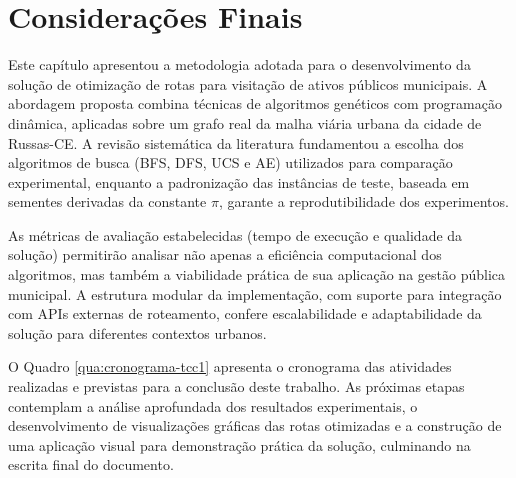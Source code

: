 \section{Considerações Finais}

Este capítulo apresentou a metodologia adotada para o desenvolvimento da solução de otimização de 
rotas para visitação de ativos públicos municipais. A abordagem proposta combina técnicas de 
algoritmos genéticos com programação dinâmica, aplicadas sobre um grafo real da malha viária urbana 
da cidade de Russas-CE. A revisão sistemática da literatura fundamentou a escolha dos algoritmos 
de busca (\gls{BFS}, \gls{DFS}, \gls{UCS} e \gls{AE}) utilizados para comparação experimental, 
enquanto a padronização das instâncias de teste, baseada em sementes derivadas da constante $\pi$, 
garante a reprodutibilidade dos experimentos.

As métricas de avaliação estabelecidas (tempo de execução e qualidade da solução) permitirão 
analisar não apenas a eficiência computacional dos algoritmos, mas também a viabilidade prática 
de sua aplicação na gestão pública municipal. A estrutura modular da implementação, com suporte 
para integração com \gls{API}s externas de roteamento, confere escalabilidade e adaptabilidade 
da solução para diferentes contextos urbanos.

O Quadro \ref{qua:cronograma-tcc1} apresenta o cronograma das atividades realizadas e previstas 
para a conclusão deste trabalho. As próximas etapas contemplam a análise aprofundada dos resultados 
experimentais, o desenvolvimento de visualizações gráficas das rotas otimizadas e a construção de 
uma aplicação visual para demonstração prática da solução, culminando na escrita final do documento.


